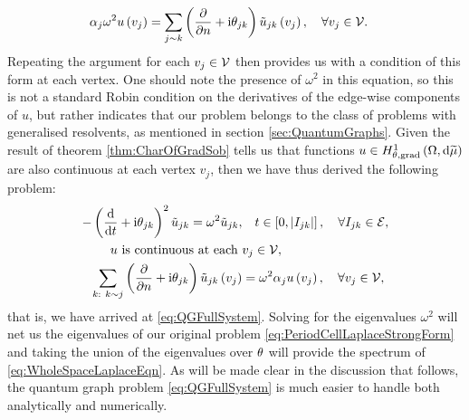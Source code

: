 \begin{align*}
	\alpha_j\omega^2 u\left( v_j \right) &= \sum_{j\sim k}\left( \dfrac{\partial }{\partial n} + \mathrm{i}\theta_{jk} \right)\tilde{u}_{jk}\left( v_j \right), \quad \forall v_j \in \mathcal{V}.
\end{align*}
Repeating the argument for each $v_j\in \mathcal{V}$ then provides us with a condition of this form at each vertex.
One should note the presence of $\omega^2$ in this equation, so this is not a standard Robin condition on the derivatives of the edge-wise components of $u$, but rather indicates that our problem belongs to the class of problems with generalised resolvents, as mentioned in section \ref{sec:QuantumGraphs}.
Given the result of theorem \ref{thm:CharOfGradSob} tells us that functions $u\in H^1_{\theta, \mathrm{grad}}\left( \Omega, \mathrm{d}\widetilde{\mu} \right)$ are also continuous at each vertex $v_j$, then we have thus derived the following problem:
\begin{align*}
	-\left( \dfrac{\mathrm{d}}{\mathrm{d}t} + \mathrm{i}\theta_{jk} \right)^2 \tilde{u}_{jk} = \omega^2 \tilde{u}_{jk}, &\quad t\in\left[ 0,\left\lvert I_{jk} \right\rvert \right], \quad \forall I_{jk}\in \mathcal{E}, \\
	u \text{ is continuous at each } &v_j \in \mathcal{V}, \\
	\sum_{k: \ k\sim j}\left( \dfrac{\partial }{\partial n} + \mathrm{i}\theta_{jk} \right)\tilde{u}_{jk}\left( v_j \right) &= \omega^2\alpha_{j}u\left( v_j \right),  \quad \forall v_j \in \mathcal{V},
\end{align*}
that is, we have arrived at \eqref{eq:QGFullSystem}.
Solving for the eigenvalues $\omega^2$ will net us the eigenvalues of our original problem \eqref{eq:PeriodCellLaplaceStrongForm} and taking the union of the eigenvalues over $\theta$ will provide the spectrum of \eqref{eq:WholeSpaceLaplaceEqn}.
As will be made clear in the discussion that follows, the quantum graph problem \eqref{eq:QGFullSystem} is much easier to handle both analytically and numerically.